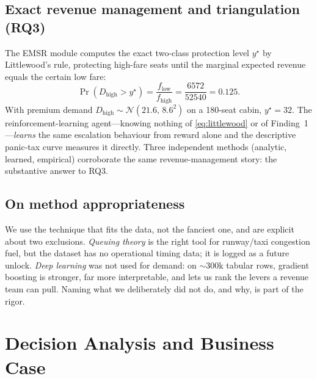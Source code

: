 \documentclass[conference]{IEEEtran}
\begin{document}
\subsection{Exact revenue management and triangulation (RQ3)}
The EMSR module computes the exact two-class protection level $y^\star$ by Littlewood's rule, protecting high-fare seats until the marginal expected revenue equals the certain low fare:
\begin{equation}
\Pr\!\left(D_{\mathrm{high}} > y^\star\right) = \frac{f_{\mathrm{low}}}{f_{\mathrm{high}}} = \frac{6572}{52540} = 0.125.
\label{eq:littlewood}
\end{equation}
With premium demand $D_{\mathrm{high}}\sim\mathcal{N}(21.6,\,8.6^2)$ on a 180-seat cabin, $y^\star=32$. The reinforcement-learning agent---knowing nothing of \eqref{eq:littlewood} or of Finding~1---\emph{learns} the same escalation behaviour from reward alone and the descriptive panic-tax curve measures it directly. Three independent methods (analytic, learned, empirical) corroborate the same revenue-management story: the substantive answer to RQ3.

\subsection{On method appropriateness}
We use the technique that fits the data, not the fanciest one, and are explicit about two exclusions. \emph{Queuing theory} is the right tool for runway/taxi congestion fuel, but the dataset has no operational timing data; it is logged as a future unlock. \emph{Deep learning} was not used for demand: on $\sim$300k tabular rows, gradient boosting is stronger, far more interpretable, and lets us rank the levers a revenue team can pull. Naming what we deliberately did not do, and why, is part of the rigor.

\section{Decision Analysis and Business Case}
\end{document}
